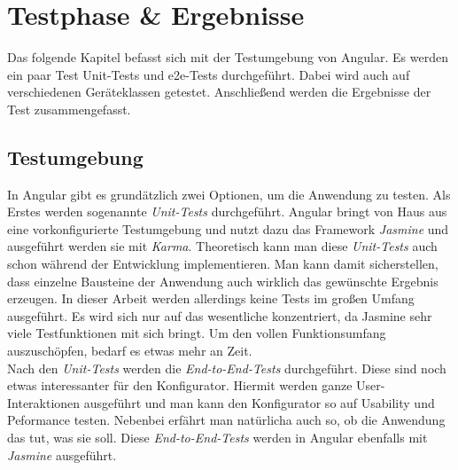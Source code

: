 %
%
%
\chapter{Testphase \& Ergebnisse}
\label{cha:testphase}
%
Das folgende Kapitel befasst sich mit der Testumgebung von Angular. Es werden ein paar Test Unit-Tests und e2e-Tests durchgeführt. Dabei wird auch auf verschiedenen Geräteklassen getestet. Anschließend werden die Ergebnisse der Test zusammengefasst.
\section{Testumgebung}
In Angular gibt es grundätzlich zwei Optionen, um die Anwendung zu testen. Als Erstes werden sogenannte \textit{Unit-Tests} durchgeführt. Angular bringt von Haus aus eine vorkonfigurierte Testumgebung und nutzt dazu das Framework \textit{Jasmine} und ausgeführt werden sie mit \textit{Karma}. Theoretisch kann man diese \textit{Unit-Tests} auch schon während der Entwicklung implementieren. Man kann damit sicherstellen, dass einzelne Bausteine der Anwendung auch wirklich das gewünschte Ergebnis erzeugen. In dieser Arbeit werden allerdings keine Tests im großen Umfang ausgeführt. Es wird sich nur auf das wesentliche konzentriert, da Jasmine sehr viele Testfunktionen mit sich bringt. Um den vollen Funktionsumfang auszuschöpfen, bedarf es etwas mehr an Zeit. \\
Nach den \textit{Unit-Tests} werden die \textit{End-to-End-Tests} durchgeführt. Diese sind noch etwas interessanter für den Konfigurator. Hiermit werden ganze User-Interaktionen ausgeführt und man kann den Konfigurator so auf Usability und Peformance testen. Nebenbei erfährt man natürlicha auch so, ob die Anwendung das tut, was sie soll. Diese \textit{End-to-End-Tests} werden in Angular ebenfalls mit \textit{Jasmine} ausgeführt.
%
